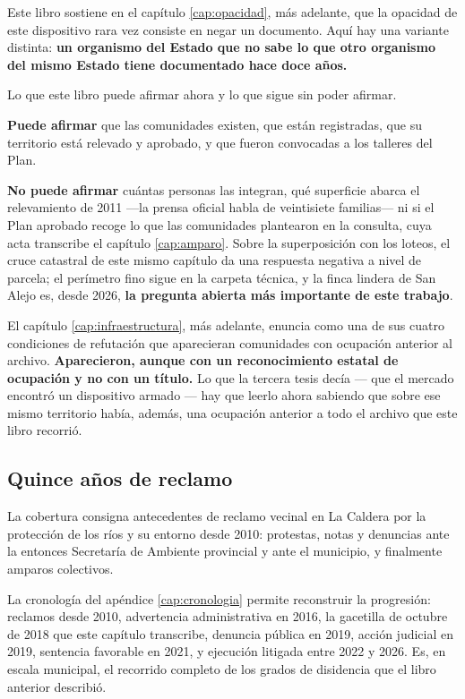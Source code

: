 Este libro sostiene en el capítulo \ref{cap:opacidad}, más adelante, que la opacidad de este dispositivo rara vez consiste
en negar un documento. Aquí hay una variante distinta: \textbf{un organismo del
Estado que no sabe lo que otro organismo del mismo Estado tiene documentado hace doce años.}

\begin{cautela}
Lo que este libro puede afirmar ahora y lo que sigue sin poder afirmar.

\textbf{Puede afirmar} que las comunidades existen, que están registradas, que su territorio
está relevado y aprobado, y que fueron convocadas a los talleres del Plan.

\textbf{No puede afirmar} cuántas personas las integran, qué superficie abarca el relevamiento
de 2011 ---la prensa oficial habla de veintisiete familias--- ni si el Plan aprobado recoge lo que las comunidades plantearon en la consulta, cuya acta transcribe el capítulo \ref{cap:amparo}.
Sobre la superposición con los loteos, el cruce catastral de este mismo capítulo da una respuesta negativa a nivel de parcela; el perímetro fino sigue en la carpeta técnica, y la finca lindera de San Alejo es, desde 2026, \textbf{la pregunta abierta más importante de este trabajo}.

El capítulo \ref{cap:infraestructura}, más adelante, enuncia como una de sus cuatro condiciones de refutación que aparecieran comunidades con ocupación anterior al archivo. \textbf{Aparecieron, aunque con un reconocimiento estatal de ocupación y no con un título.} Lo que la
tercera tesis decía --- que el mercado encontró un dispositivo armado --- hay que leerlo ahora
sabiendo que sobre ese mismo territorio había, además, una ocupación anterior a todo el
archivo que este libro recorrió.
\end{cautela}

\subsection*{Quince años de reclamo}

La cobertura consigna antecedentes de reclamo vecinal en La Caldera por la protección de los ríos y su entorno desde 2010: protestas, notas y denuncias ante la entonces Secretaría de Ambiente provincial y ante el municipio, y finalmente amparos colectivos.

La cronología del apéndice \ref{cap:cronologia} permite reconstruir la progresión: reclamos desde 2010, advertencia administrativa en 2016, la gacetilla de octubre de 2018 que este capítulo transcribe, denuncia pública en 2019, acción judicial en 2019, sentencia favorable en 2021, y ejecución litigada entre 2022 y 2026. Es, en escala municipal, el recorrido completo de los grados de disidencia que el libro anterior describió.

